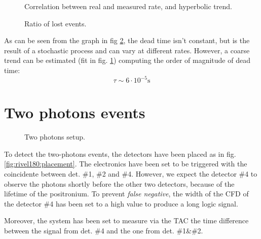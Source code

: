 \documentclass[11pt,a4 paper]{article}
\begin{document}
\begin{figure}[H]
  \centering
  \caption{Correlation between real and measured rate, and hyperbolic trend.}
  \label{fig:deadtime:fit}
\end{figure}

\begin{figure}[H]
  \centering
  \caption{Ratio of lost events.}
  \label{fig:deadtime}
\end{figure}

As can be seen from the graph in fig \ref{fig:deadtime}, the dead time isn't constant, but is the result of a stochastic process and can vary at different rates. However, a coarse trend can be estimated (fit in fig. \ref{fig:deadtime:fit}) computing the order of magnitude of dead time:
\begin{equation*}
    \tau \sim 6\cdot10^{-5} \si{\second}
\end{equation*}



\section{Two photons events}

\begin{figure}[H]
    \centering
    { \label{fig:rivel180:placement}} \quad
    {}
    \caption{Two photons setup.}
    \label{fig:rivel180}
\end{figure}

To detect the two-photons events, the detectors have been placed as in fig. \ref{fig:rivel180:placement}. The electronics have been set to be triggered with the coincidente between det. \#1, \#2 and \#4. However, we expect the detector \#4 to observe the photons shortly before the other two detectors, because of the lifetime of the positronium. To prevent \emph{false negative}, the width of the CFD of the detector \#4 has been set to a high value to produce a long logic signal.

Moreover, the system has been set to measure via the TAC the time difference between the signal from det. \#4 and the one from det. \#1\&\#2.
\end{document}

